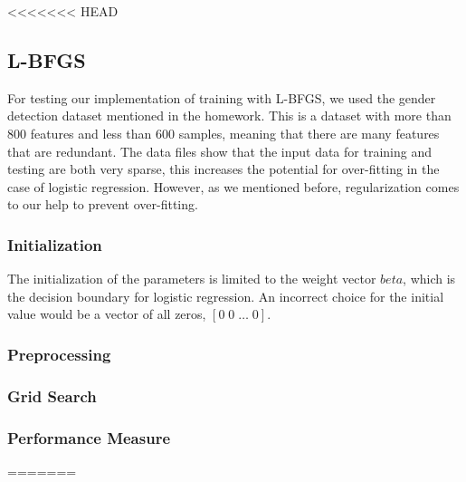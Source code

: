 \documentclass[twoside,12pt]{article}
\begin{document}
<<<<<<< HEAD
\subsection{L-BFGS}
For testing our implementation of training with L-BFGS, we used the gender detection dataset mentioned in the homework. This is a dataset with more than 800 features and less than 600 samples, meaning that there are many features that are redundant. The data files show that the input data for training and testing are both very sparse, this increases the potential for over-fitting in the case of logistic regression. However, as we mentioned before, regularization comes to our help to prevent over-fitting.
\subsubsection{Initialization}
The initialization of the parameters is limited to the weight vector $beta$, which is the decision boundary for logistic regression. An incorrect choice for the initial value would be a vector of all zeros, $[0\; 0\; \ldots\; 0]$.
\subsubsection{Preprocessing}
\subsubsection{Grid Search}
\subsubsection{Performance Measure}
=======
\end{document}
